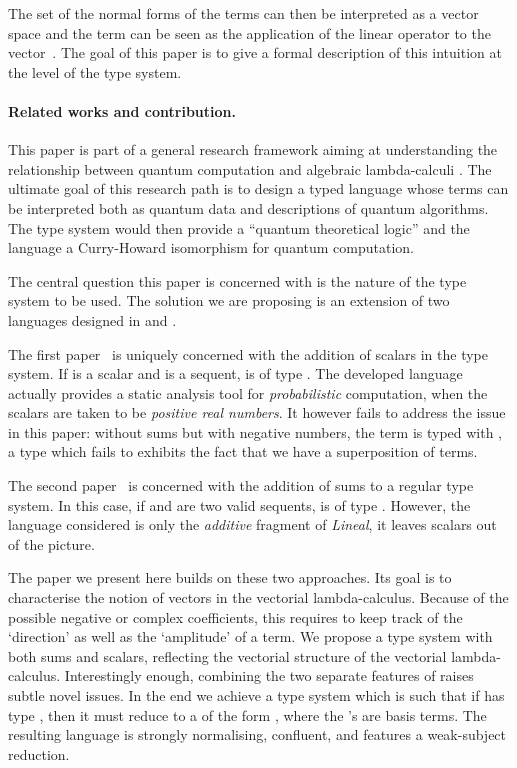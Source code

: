 \documentclass[colorlinks=true,linkcolor=black,urlcolor=black,citecolor=blue,submission,copyright,creativecommons]{eptcs}
\begin{document}
The set of the normal forms of the terms can then be interpreted as a vector space and the
term  can be seen as the application of
the linear operator  to the vector~.
The goal of this paper is to give a formal description of this
intuition at the level of the type system.


\paragraph{Related works and contribution.}
This paper is part of a general research framework aiming at
understanding the relationship between quantum computation and
algebraic lambda-calculi
\cite{AltenkirchGrattageLICS05,ArrighiDowekRTA08,tonder04lambda,ValironQPL10}. The ultimate
goal of this research path is to design a typed language whose terms
can be interpreted both as quantum data and descriptions of quantum
algorithms. The type system would then provide a ``quantum theoretical logic'' and
the language a Curry-Howard isomorphism for quantum computation.

The central question this paper is concerned with is the nature of the
type system to be used. The solution we are proposing is an extension
of two languages designed in \cite{ArrighiDiazcaroQPL09} and
\cite{DiazcaroPetitWoLLIC12}.

The first paper~\cite{ArrighiDiazcaroQPL09} is uniquely concerned with the addition of
scalars in the type system. If  is a scalar and
 is a sequent,  is of type
. The developed language actually provides a static analysis
tool for {\it probabilistic} computation, when the scalars are taken
to be {\it positive real numbers}. It however fails to address the issue in
this paper: without sums but with negative numbers, the term  is typed with , a type which fails to exhibits the fact that we have a superposition of terms.

The second paper~\cite{DiazcaroPetitWoLLIC12} is concerned with the addition of sums to a
regular type system. In this case, if  and  are two valid sequents,
 is of type . However, the language considered is only the {\it
  additive} fragment of {\it Lineal}, it leaves scalars out of the picture.

The paper we present here builds on these two approaches. Its goal is
to characterise the notion of vectors in the vectorial
lambda-calculus. Because of the possible negative or complex
coefficients, this requires to keep track of the `direction' as well
as the `amplitude' of a term.  We propose a type system with both sums
and scalars, reflecting the vectorial structure of the vectorial
lambda-calculus. 
Interestingly enough, combining the two separate features of
\cite{ArrighiDiazcaroQPL09,DiazcaroPetitWoLLIC12} raises subtle novel
issues. In the end we achieve a type system which is such that if  has type , then it must reduce to a  of the form , where the 's
are basis terms.  The resulting language is strongly normalising,
confluent, and features a weak-subject reduction.
\end{document}
